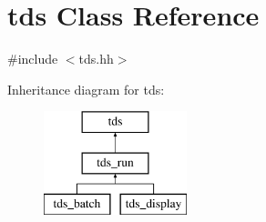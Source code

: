 \hypertarget{classtds}{}\section{tds Class Reference}
\label{classtds}


{\ttfamily \#include $<$tds.\+hh$>$}

Inheritance diagram for tds\+:\begin{figure}[H]
\begin{center}
\leavevmode
\includegraphics[height=3.000000cm]{classtds}
\end{center}
\end{figure}

